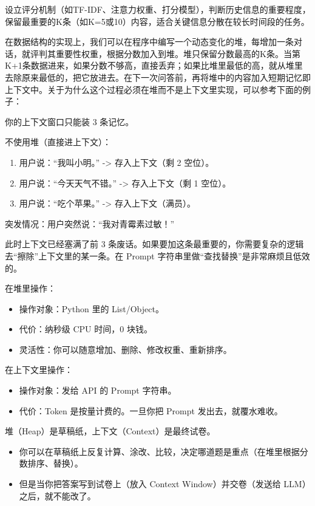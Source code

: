 设立评分机制（如TF-IDF、注意力权重、打分模型），判断历史信息的重要程度，保留最重要的K条（如K=5或10）内容，适合关键信息分散在较长时间段的任务。

在数据结构的实现上，我们可以在程序中编写一个动态变化的堆，每增加一条对话，就评判其重要性权重，根据分数加入到堆。堆只保留分数最高的K条。当第K+1条数据进来，如果分数不够高，直接丢弃；如果比堆里最低的高，就从堆里去除原来最低的，把它放进去。在下一次问答前，再将堆中的内容加入短期记忆即上下文中。关于为什么这个过程必须在堆而不是上下文里实现，可以参考下面的例子：

你的上下文窗口只能装 3 条记忆。

不使用堆（直接进上下文）：

\begin{enumerate}
\def\labelenumi{\arabic{enumi}.}
\tightlist
\item
  用户说：``我叫小明。'' -\textgreater{} 存入上下文（剩 2 空位）。
\item
  用户说：``今天天气不错。'' -\textgreater{} 存入上下文（剩 1 空位）。
\item
  用户说：``吃个苹果。'' -\textgreater{} 存入上下文（满员）。
\end{enumerate}

突发情况：用户突然说：``我对青霉素过敏！''

此时上下文已经塞满了前 3 条废话。如果要加这条最重要的，你需要复杂的逻辑去``擦除''上下文里的某一条。在 Prompt 字符串里做``查找替换''是非常麻烦且低效的。

在堆里操作：

\begin{itemize}
\tightlist
\item
  操作对象：Python 里的 List/Object。
\item
  代价：纳秒级 CPU 时间，0 块钱。
\item
  灵活性：你可以随意增加、删除、修改权重、重新排序。
\end{itemize}

在上下文里操作：

\begin{itemize}
\tightlist
\item
  操作对象：发给 API 的 Prompt 字符串。
\item
  代价：Token 是按量计费的。一旦你把 Prompt 发出去，就覆水难收。
\end{itemize}

堆（Heap）是草稿纸，上下文（Context）是最终试卷。

\begin{itemize}
\tightlist
\item
  你可以在草稿纸上反复计算、涂改、比较，决定哪道题是重点（在堆里根据分数排序、替换）。
\item
  但是当你把答案写到试卷上（放入 Context Window）并交卷（发送给 LLM）之后，就不能改了。
\end{itemize}


